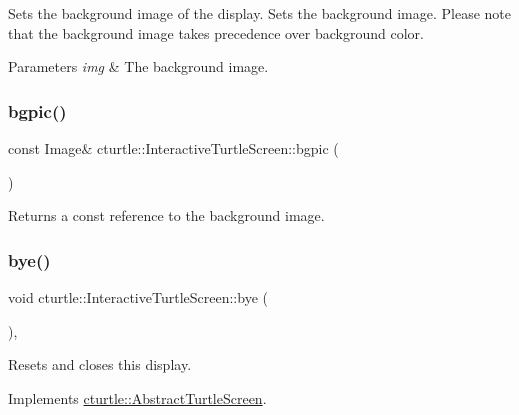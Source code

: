 Sets the background image of the display. Sets the background image. Please note that the background image takes precedence over background color. 


\begin{DoxyParams}{Parameters}
{\em img} & The background image. \\
\hline
\end{DoxyParams}
\mbox{\label{classcturtle_1_1InteractiveTurtleScreen_a57a90b8e6163e46c6fcb6f37b0b00e78}} 
\subsubsection{\texorpdfstring{bgpic()}{bgpic()}\hspace{0.1cm}{\footnotesize\ttfamily [2/2]}}
{\footnotesize\ttfamily const Image\& cturtle\+::\+Interactive\+Turtle\+Screen\+::bgpic (\begin{DoxyParamCaption}{ }\end{DoxyParamCaption})\hspace{0.3cm}{\ttfamily [inline]}}

Returns a const reference to the background image. \mbox{\label{classcturtle_1_1InteractiveTurtleScreen_a045b2cc0c8869140015abcc11226a714}} 
\subsubsection{\texorpdfstring{bye()}{bye()}}
{\footnotesize\ttfamily void cturtle\+::\+Interactive\+Turtle\+Screen\+::bye (\begin{DoxyParamCaption}{ }\end{DoxyParamCaption})\hspace{0.3cm}{\ttfamily [inline]}, {\ttfamily [virtual]}}

Resets and closes this display. 

Implements \hyperlink{classcturtle_1_1AbstractTurtleScreen}{cturtle\+::\+Abstract\+Turtle\+Screen}.

